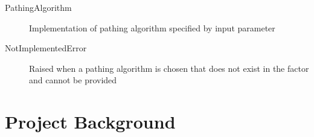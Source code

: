 \documentclass[letterpaper,10pt,english]{sphinxmanual}
\begin{document}
\sphinxAtStartPar
{}
\begin{description}
\item[{PathingAlgorithm}] \leavevmode
\sphinxAtStartPar
Implementation of pathing algorithm specified by input parameter

\end{description}

\sphinxAtStartPar
{}
\begin{description}
\item[{NotImplementedError}] \leavevmode
\sphinxAtStartPar
Raised when a pathing algorithm is chosen that does not exist in the factor and cannot be provided

\end{description}

\begin{sphinxVerbatim}[commandchars=\\\{\}]
 \PYG{p}{[} \PYG{p}{[}\PYG{p}{]}\PYG{p}{]}
  
         
         

         \PYG{p}{[}\PYG{p}{]}
 
          
\end{sphinxVerbatim}


\section{Project Background}
\label{\detokenize{background_science:project-background}}\label{\detokenize{background_science::doc}}
\end{document}
